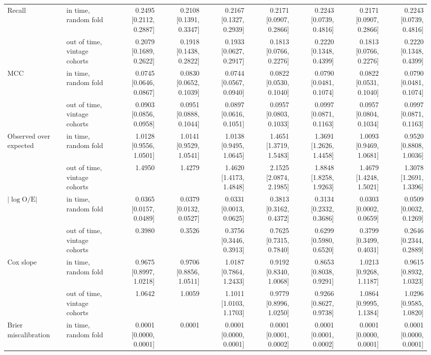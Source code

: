 \begin{tabular}{llrrrrrrr}
\addlinespace
Recall & in time, random fold & 0.2495 [0.2112, 0.2887] & 0.2108 [0.1391, 0.3347] & 0.2167 [0.1327, 0.2939] & 0.2171 [0.0907, 0.2866] & 0.2243 [0.0739, 0.4816] & 0.2171 [0.0907, 0.2866] & 0.2243 [0.0739, 0.4816] \\
 & out of time, vintage cohorts & 0.2079 [0.1689, 0.2622] & 0.1918 [0.1438, 0.2822] & 0.1933 [0.0627, 0.2917] & 0.1813 [0.0766, 0.2276] & 0.2220 [0.1348, 0.4399] & 0.1813 [0.0766, 0.2276] & 0.2220 [0.1348, 0.4399] \\
\addlinespace
MCC & in time, random fold & 0.0745 [0.0646, 0.0867] & 0.0830 [0.0652, 0.1039] & 0.0744 [0.0567, 0.0940] & 0.0822 [0.0530, 0.1040] & 0.0790 [0.0481, 0.1074] & 0.0822 [0.0531, 0.1040] & 0.0790 [0.0481, 0.1074] \\
 & out of time, vintage cohorts & 0.0903 [0.0856, 0.0958] & 0.0951 [0.0888, 0.1044] & 0.0897 [0.0616, 0.1051] & 0.0957 [0.0803, 0.1033] & 0.0997 [0.0871, 0.1163] & 0.0957 [0.0804, 0.1034] & 0.0997 [0.0871, 0.1163] \\
\addlinespace
Observed over expected & in time, random fold & 1.0128 [0.9556, 1.0501] & 1.0141 [0.9529, 1.0541] & 1.0138 [0.9495, 1.0645] & 1.4651 [1.3719, 1.5483] & 1.3691 [1.2626, 1.4458] & 1.0093 [0.9469, 1.0681] & 0.9520 [0.8808, 1.0036] \\
 & out of time, vintage cohorts & 1.4950 & 1.4279 & 1.4620 [1.4173, 1.4848] & 2.1525 [2.0874, 2.1985] & 1.8848 [1.8258, 1.9263] & 1.4679 [1.4248, 1.5021] & 1.3078 [1.2691, 1.3396] \\
\addlinespace
$|\log \mathrm{O/E}|$ & in time, random fold & 0.0365 [0.0157, 0.0489] & 0.0379 [0.0132, 0.0527] & 0.0331 [0.0013, 0.0625] & 0.3813 [0.3162, 0.4372] & 0.3134 [0.2332, 0.3686] & 0.0303 [0.0002, 0.0659] & 0.0509 [0.0032, 0.1269] \\
 & out of time, vintage cohorts & 0.3980 & 0.3526 & 0.3756 [0.3446, 0.3913] & 0.7625 [0.7315, 0.7840] & 0.6299 [0.5980, 0.6520] & 0.3799 [0.3499, 0.4031] & 0.2646 [0.2344, 0.2889] \\
\addlinespace
Cox slope & in time, random fold & 0.9675 [0.8997, 1.0218] & 0.9706 [0.8856, 1.0511] & 1.0187 [0.7864, 1.2433] & 0.9192 [0.8340, 1.0068] & 0.8653 [0.8038, 0.9291] & 1.0213 [0.9268, 1.1187] & 0.9615 [0.8932, 1.0323] \\
 & out of time, vintage cohorts & 1.0642 & 1.0059 & 1.1011 [1.0103, 1.1703] & 0.9779 [0.8996, 1.0250] & 0.9266 [0.8627, 0.9738] & 1.0864 [0.9995, 1.1384] & 1.0296 [0.9585, 1.0820] \\
\addlinespace
Brier miscalibration & in time, random fold & 0.0001 [0.0000, 0.0001] & 0.0001 & 0.0001 [0.0000, 0.0001] & 0.0001 [0.0001, 0.0002] & 0.0001 [0.0001, 0.0002] & 0.0001 [0.0000, 0.0001] & 0.0001 [0.0000, 0.0001] \\

\end{tabular}
